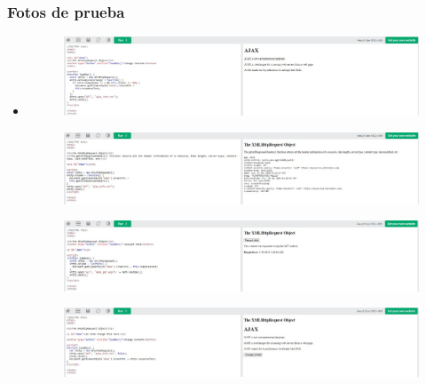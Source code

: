 \documentclass{article}
\begin{document}
	\subsubsection{Fotos de prueba}
	\begin{itemize}
		\item \begin{figure}[H]
			\centering
			\includegraphics[width=1.0\textwidth,keepaspectratio]{img/W1.jpg}
		\end{figure}
		\begin{figure}[H]
			\centering
			\includegraphics[width=1.0\textwidth,keepaspectratio]{img/w2.jpg}
		\end{figure}
		\begin{figure}[H]
			\centering
			\includegraphics[width=1.0\textwidth,keepaspectratio]{img/w3.jpg}
		\end{figure}
		\begin{figure}[H]
			\centering
			\includegraphics[width=1.0\textwidth,keepaspectratio]{img/w4.jpg}

\end{figure}
\end{itemize}
\end{document}
